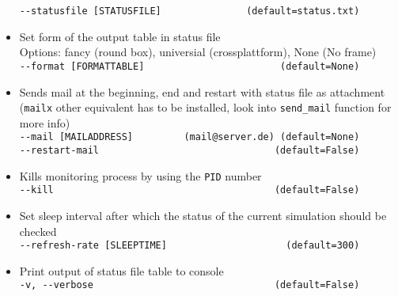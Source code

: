 \begin{itemize}
          \texttt{-\/-statusfile [STATUSFILE]~~~~~~~~~~~~~~~(default=status.txt)}
    \item Set form of the output table in status file\\
          Options: fancy (round box), universial (crossplattform), None (No frame)\\
          \texttt{-\/-format [FORMATTABLE]~~~~~~~~~~~~~~~~~~~~~~~~(default=None)}
    \item Sends mail at the beginning, end and restart with status file as attachment\\
          (\texttt{mailx} other equivalent has to be installed, look into \texttt{send\_mail} function for more info)\\
          \texttt{-\/-mail [MAILADDRESS]~~~~~~~~~(mail@server.de)~(default=None)}\\
          \texttt{-\/-restart-mail ~~~~~~~~~~~~~~~~~~~~~~~~~~~~~~(default=False)}
    \item Kills monitoring process by using the \texttt{PID} number\\
          \texttt{-\/-kill~~~~~~~~~~~~~~~~~~~~~~~~~~~~~~~~~~~~~~~(default=False)}
    \item Set sleep interval after which the status of the current simulation should be checked\\
          \texttt{-\/-refresh-rate [SLEEPTIME]~~~~~~~~~~~~~~~~~~~~~(default=300)}
    \item Print output of status file table to console\\
          \texttt{-v, -\/-verbose~~~~~~~~~~~~~~~~~~~~~~~~~~~~~~~\,(default=False)}
\end{itemize}

